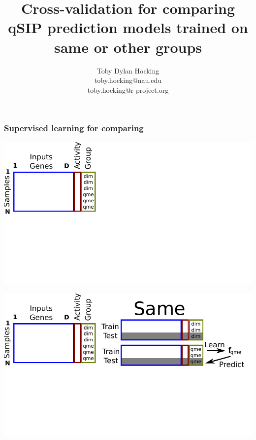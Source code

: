 \documentclass{beamer}
\begin{document}
\title{Cross-validation for comparing qSIP prediction models trained
  on same or other groups}

\author{
  Toby Dylan Hocking\\
  toby.hocking@nau.edu\\
  toby.hocking@r-project.org\\
}

\maketitle


\begin{frame}
  \frametitle{Supervised learning for comparing }
\end{frame}

\begin{frame}
  \includegraphics[width=\textwidth]{drawing-cv-same-other-1}
\end{frame}

\begin{frame}
  \includegraphics[width=\textwidth]{drawing-cv-same-other-2}
\end{frame}
\end{document}
